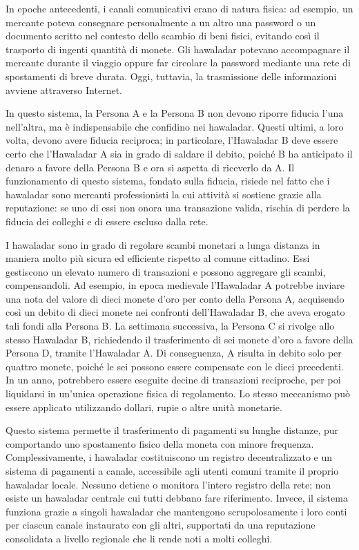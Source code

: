 \documentclass[
  a5paper,
  smalldemyvopaper,10pt,twoside,onecolumn,openright,extrafontsizes,hidelinks]{memoir}
\begin{document}
In epoche antecedenti, i canali comunicativi erano di natura fisica: ad
esempio, un mercante poteva consegnare personalmente a un altro una
password o un documento scritto nel contesto dello scambio di beni
fisici, evitando così il trasporto di ingenti quantità di monete. Gli
hawaladar potevano accompagnare il mercante durante il viaggio oppure
far circolare la password mediante una rete di spostamenti di breve
durata. Oggi, tuttavia, la trasmissione delle informazioni avviene
attraverso Internet.

In questo sistema, la Persona A e la Persona B non devono riporre
fiducia l'una nell'altra, ma è indispensabile che confidino nei
hawaladar. Questi ultimi, a loro volta, devono avere fiducia reciproca;
in particolare, l'Hawaladar B deve essere certo che l'Hawaladar A sia in
grado di saldare il debito, poiché B ha anticipato il denaro a favore
della Persona B e ora si aspetta di riceverlo da A. Il funzionamento di
questo sistema, fondato sulla fiducia, risiede nel fatto che i hawaladar
sono mercanti professionisti la cui attività si sostiene grazie alla
reputazione: se uno di essi non onora una transazione valida, rischia di
perdere la fiducia dei colleghi e di essere escluso dalla rete.

I hawaladar sono in grado di regolare scambi monetari a lunga distanza
in maniera molto più sicura ed efficiente rispetto al comune cittadino.
Essi gestiscono un elevato numero di transazioni e possono aggregare gli
scambi, compensandoli. Ad esempio, in epoca medievale l'Hawaladar A
potrebbe inviare una nota del valore di dieci monete d'oro per conto
della Persona A, acquisendo così un debito di dieci monete nei confronti
dell'Hawaladar B, che aveva erogato tali fondi alla Persona B. La
settimana successiva, la Persona C si rivolge allo stesso Hawaladar B,
richiedendo il trasferimento di sei monete d'oro a favore della Persona
D, tramite l'Hawaladar A. Di conseguenza, A risulta in debito solo per
quattro monete, poiché le sei possono essere compensate con le dieci
precedenti. In un anno, potrebbero essere eseguite decine di transazioni
reciproche, per poi liquidarsi in un'unica operazione fisica di
regolamento. Lo stesso meccanismo può essere applicato utilizzando
dollari, rupie o altre unità monetarie.

Questo sistema permette il trasferimento di pagamenti su lunghe
distanze, pur comportando uno spostamento fisico della moneta con minore
frequenza. Complessivamente, i hawaladar costituiscono un registro
decentralizzato e un sistema di pagamenti a canale, accessibile agli
utenti comuni tramite il proprio hawaladar locale. Nessuno detiene o
monitora l'intero registro della rete; non esiste un hawaladar centrale
cui tutti debbano fare riferimento. Invece, il sistema funziona grazie a
singoli hawaladar che mantengono scrupolosamente i loro conti per
ciascun canale instaurato con gli altri, supportati da una reputazione
consolidata a livello regionale che li rende noti a molti colleghi.
\end{document}
